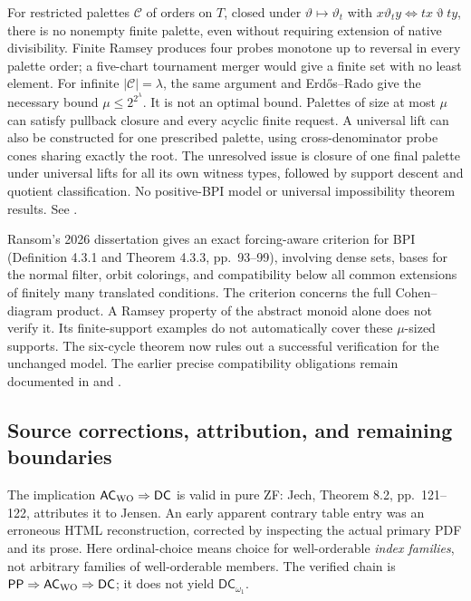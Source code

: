 For restricted palettes $\mathcal C$ of orders on $T$, closed under
$\vartheta\mapsto\vartheta_t$ with
$x\mathrel{\vartheta_t}y\Longleftrightarrow tx\mathrel\vartheta ty$,
there is no nonempty finite palette, even without requiring extension
of native divisibility. Finite Ramsey produces four probes monotone
up to reversal in every palette order; a five-chart tournament merger
would give a finite set with no least element. For infinite
$|\mathcal C|=\lambda$, the same argument and Erd\H{o}s--Rado give the
necessary bound $\mu\leq2^{2^\lambda}$. It is not an optimal bound.
Palettes of size at most $\mu$ can satisfy pullback closure and every
acyclic finite request. A universal lift can also be constructed for
one prescribed palette, using cross-denominator probe cones sharing
exactly the root. The unresolved issue is closure of one final palette
under universal lifts for all its own witness types, followed by support
descent and quotient classification. No positive-BPI model or universal
impossibility theorem results. See .

Ransom's 2026 dissertation gives an exact forcing-aware criterion for
BPI (Definition 4.3.1 and Theorem 4.3.3, pp.~93--99), involving dense
sets, bases for the normal filter, orbit colorings, and compatibility
below all common extensions of finitely many translated conditions.
The criterion concerns the full Cohen--diagram product. A Ramsey
property of the abstract monoid alone does not verify it. Its
finite-support examples do not automatically cover these $\mu$-sized
supports. The six-cycle theorem now rules out a successful verification
for the unchanged model. The earlier precise compatibility obligations
remain documented in  and
.

\subsection{Source corrections, attribution, and remaining boundaries}

The implication $\mathsf{AC}_{\rm WO}\Rightarrow\mathsf{DC}$ is valid
in pure ZF: Jech, Theorem 8.2, pp.~121--122, attributes it to Jensen.
An early apparent contrary table entry was an erroneous HTML
reconstruction, corrected by inspecting the actual primary PDF and
its prose. Here ordinal-choice means choice for well-orderable
\emph{index families}, not arbitrary families of well-orderable
members. The verified chain is
$\mathsf{PP}\Rightarrow\mathsf{AC}_{\rm WO}\Rightarrow\mathsf{DC}$;
it does not yield $\mathsf{DC}_{\omega_1}$.

